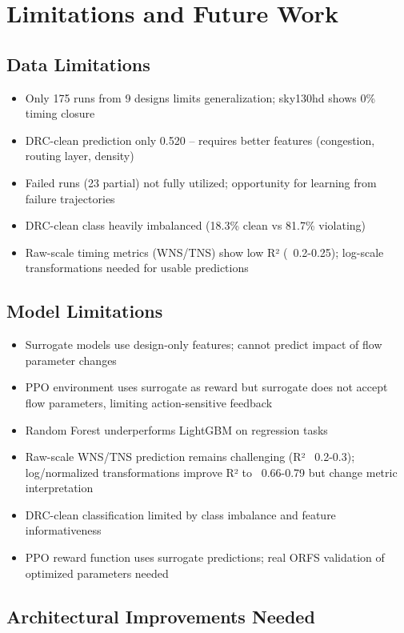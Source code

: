 \documentclass[10pt,conference]{IEEEtran}
\newcommand{\AUC}{\text{AUC}}
\begin{document}
\begin{table}[t]
\section{Limitations and Future Work}
\label{sec:limitations}

\subsection{Data Limitations}
\begin{itemize}
    \item Only 175 runs from 9 designs limits generalization; sky130hd shows 0\% timing closure
    \item DRC-clean prediction \AUC{} only 0.520 -- requires better features (congestion, routing layer, density)
    \item Failed runs (23 partial) not fully utilized; opportunity for learning from failure trajectories
    \item DRC-clean class heavily imbalanced (18.3\% clean vs 81.7\% violating)
    \item Raw-scale timing metrics (WNS/TNS) show low R² (~0.2-0.25); log-scale transformations needed for usable predictions
\end{itemize}

\subsection{Model Limitations}
\begin{itemize}
    \item Surrogate models use design-only features; cannot predict impact of flow parameter changes
    \item PPO environment uses surrogate as reward but surrogate does not accept flow parameters, limiting action-sensitive feedback
    \item Random Forest underperforms LightGBM on regression tasks
    \item Raw-scale WNS/TNS prediction remains challenging (R² ~0.2-0.3); log/normalized transformations improve R² to ~0.66-0.79 but change metric interpretation
    \item DRC-clean classification limited by class imbalance and feature informativeness
    \item PPO reward function uses surrogate predictions; real ORFS validation of optimized parameters needed
\end{itemize}

\subsection{Architectural Improvements Needed}


\end{table}
\end{document}
